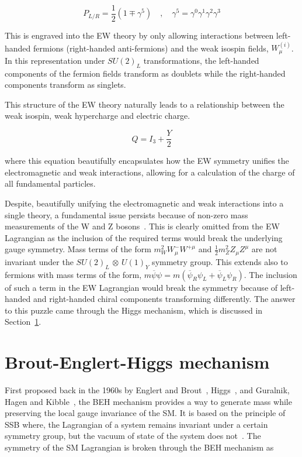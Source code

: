 \begin{equation}
    P_{L/R} = \frac{1}{2}(1\mp \gamma^5) \quad ,\quad \gamma^5 = \gamma^0\gamma^1\gamma^2\gamma^3
\end{equation}

This is engraved into the EW theory by only allowing interactions between left-handed fermions (right-handed anti-fermions) and the weak isospin fields, $W_{\mu}^{(i)}$. In this representation under $SU(2)_L$ transformations, the left-handed components of the fermion fields transform as doublets while the right-handed components transform as singlets. 

This structure of the EW theory naturally leads to a relationship between the weak isospin, weak hypercharge and electric charge.

\begin{equation}
    Q = I_3 + \frac{Y}{2}
\end{equation}

where this equation beautifully encapsulates how the EW symmetry unifies the electromagnetic and weak interactions, allowing for a calculation of the charge of all fundamental particles.

Despite, beautifully unifying the electromagnetic and weak interactions into a single theory, a fundamental issue persists because of non-zero mass measurements of the W and Z bosons~\cite{W_Z_MassMeasurements_1,W_Z_MassMeasurements_2}. This is clearly omitted from the EW Lagrangian as the inclusion of the required terms would break the underlying gauge symmetry. Mass terms of the form ${m_{W}^2 W_{\mu}^{-} W^{+\mu}}$ and $\frac{1}{2} m_{Z}^{2} Z_{\mu} Z^{\mu}$ are not invariant under the $SU(2)_{L}$ $\otimes$ $U(1)_{Y}$ symmetry group. This extends also to fermions with mass terms of the form, $m\overline{\psi}\psi = m(\overline{\psi}_{R}\psi_{L} + \overline{\psi}_{L}\psi_{R})$. The inclusion of such a term in the EW Lagrangian would break the symmetry because of left-handed and right-handed chiral components transforming differently. The answer to this puzzle came through the Higgs mechanism, which is discussed in Section~\ref{Section:Introduction_HiggsMechanism}.

\section{Brout-Englert-Higgs mechanism}
\label{Section:Introduction_HiggsMechanism}
First proposed back in the 1960s by Englert and Brout~\cite{Englert_Brout}, Higgs~\cite{Higgs_2}, and Guralnik, Hagen and Kibble~\cite{Guralnik_Hagen_Kibble,Kibble_1}, the \ac{BEH} mechanism provides a way to generate mass while preserving the local gauge invariance of the SM. It is based on the principle of \ac{SSB} where, the Lagrangian of a system remains invariant under a certain symmetry group, but the vacuum of state of the system does not~\cite{SSB_Definition}. The symmetry of the SM Lagrangian is broken through the BEH mechanism as

